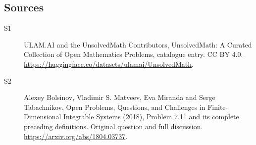 \documentclass[11pt]{article}
\begin{document}
\subsection{Sources}
\begin{description}
\item[\hypertarget{source:statement:1}{S1}] ULAM.AI and the UnsolvedMath Contributors, UnsolvedMath: A Curated Collection of Open Mathematics Problems, catalogue entry. CC BY 4.0. \url{https://huggingface.co/datasets/ulamai/UnsolvedMath}.
\item[\hypertarget{source:statement:2}{S2}] Alexey Bolsinov, Vladimir S. Matveev, Eva Miranda and Serge Tabachnikov, Open Problems, Questions, and Challenges in Finite-Dimensional Integrable Systems (2018), Problem 7.11 and its complete preceding definitions. Original question and full discussion. \url{https://arxiv.org/abs/1804.03737}.

\end{description}
\label{end:statement}
\end{document}
